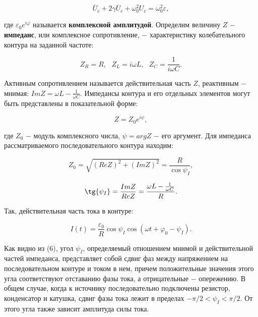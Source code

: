 \documentclass[a4paper,12pt]{article} %
\begin{document}
\begin{equation}\label{ linkname }
\ddot{U_{c}} + 2\gamma \dot{U_{c}} + \omega_{0}^2U_{c} = \omega_{0}^2\varepsilon,
\end{equation}

\hfill \break где $\varepsilon_{0}e^{i\varphi}$ называется \textbf{комплексной амплитудой}. Определим величину $Z$ $-$ \textbf{импеданс}, или комплексное сопротивление, $-$ характеристику колебательного контура на заданной частоте:

$$
Z_{R} = R, \text{ } Z_{L} = i\omega L, \text{ } Z_{C} =  \frac{1}{i\omega C}.
$$

\hfill \break Активным сопротивлением называется действительная часть $Z$, реактивным $-$ мнимая: $Im Z = \omega L - \frac{1}{\omega C}$. Импедансы контура и его отдельных элементов могут быть представлены в показательной форме:

\begin{equation}\label{ linkname }
Z = Z_{0}e^{i\psi},
\end{equation}

\hfill \break где $Z_{0}$ $-$ модуль комплексного числа, $\psi = arg Z$ $-$ его аргумент. Для импеданса рассматриваемого последовательного контура находим:

\begin{equation}\label{ linkname }
Z_{0} = \sqrt{(Re Z)^2 + (Im Z)^2} = \frac{R}{\cos{\psi_{I}}},
\end{equation}

\begin{equation}\label{ linkname }
\tg{\psi_{I}} = \frac{Im Z}{Re Z} = \frac{\omega L - \frac{1}{\omega C}}{R}.
\end{equation}

\hfill \break Так, действительная часть тока в контуре:

\begin{equation}\label{ linkname }
I(t) = \frac{\varepsilon_{0}}{R} \cos{\psi_{I}} \cos({\omega t + \varphi_{0} - \psi_{I}}).
\end{equation}

\hfill \break Как видно из (6), угол $\psi_{I}$, определяемый отношением мнимой и действительной частей импеданса, представляет собой сдвиг фаз между напряжением на последовательном контуре и током в нем, причем положительные значения этого угла соответствуют отставанию фазы тока, а отрицательные $-$ опережению. В общем случае, когда к источнику последовательно подключены резистор, конденсатор и катушка, сдвиг фазы тока лежит в пределах $-\pi/2 < \psi_{I} < \pi/2$. От этого угла также зависит амплитуда силы тока.
\end{document}
